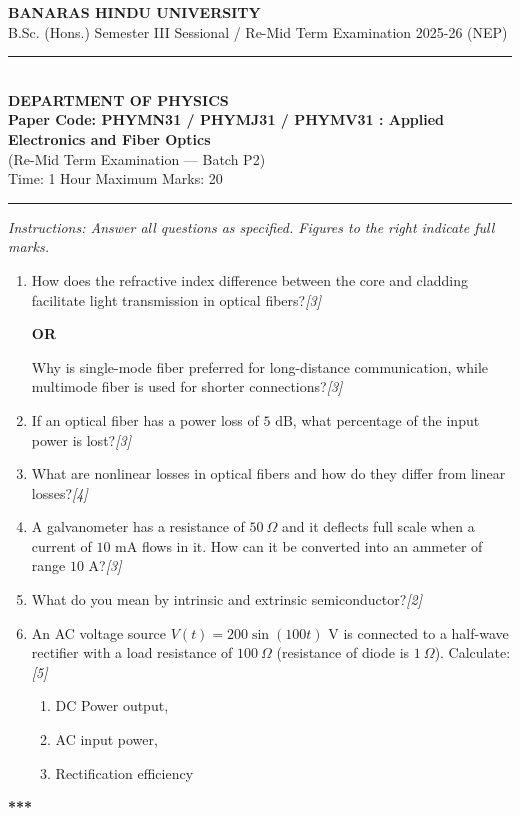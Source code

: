 \documentclass[11pt,a4paper]{article}
\newcommand{\pts}[1]{\hfill \textit{[#1]}}
\begin{document}
\begin{center}
  {\large\bfseries BANARAS HINDU UNIVERSITY}\\[2pt]
  {\normalsize B.Sc. (Hons.) Semester III Sessional / Re-Mid Term Examination 2025-26 (NEP)}\\[6pt]
  \rule{0.8\linewidth}{0.5pt}\\[6pt]
  {\large\bfseries DEPARTMENT OF PHYSICS}\\[4pt]
  {\large\bfseries Paper Code: PHYMN31 / PHYMJ31 / PHYMV31 : Applied Electronics and Fiber Optics}\\[2pt]
  {\normalsize (Re-Mid Term Examination --- Batch P2)}\\[4pt]
  {\normalsize Time: 1 Hour \hfill Maximum Marks: 20}
\end{center}
\rule{\linewidth}{0.4pt}
\smallskip

\noindent \textit{Instructions: Answer all questions as specified. Figures to the right indicate full marks.}

\bigskip

\begin{enumerate}[label=\textbf{\arabic*.},leftmargin=*,itemsep=14pt]

  \item How does the refractive index difference between the core and cladding facilitate light transmission in optical fibers?\pts{3}\\
  \begin{center}\textbf{OR}\end{center}
  Why is single-mode fiber preferred for long-distance communication, while multimode fiber is used for shorter connections?\pts{3}

  \item If an optical fiber has a power loss of $5\text{ dB}$, what percentage of the input power is lost?\pts{3}

  \item What are nonlinear losses in optical fibers and how do they differ from linear losses?\pts{4}

  \item A galvanometer has a resistance of $50\ \Omega$ and it deflects full scale when a current of $10\text{ mA}$ flows in it. How can it be converted into an ammeter of range $10\text{ A}$?\pts{3}

  \item What do you mean by intrinsic and extrinsic semiconductor?\pts{2}

  \item An AC voltage source $V(t) = 200 \sin(100 t)\text{ V}$ is connected to a half-wave rectifier with a load resistance of $100\ \Omega$ (resistance of diode is $1\ \Omega$). Calculate:\pts{5}
  \begin{enumerate}[label=(\alph*),itemsep=3pt,topsep=4pt]
    \item DC Power output,
    \item AC input power,
    \item Rectification efficiency
  \end{enumerate}

\end{enumerate}

\bigskip
\begin{center}
  \textbf{***}
\end{center}
\end{document}
